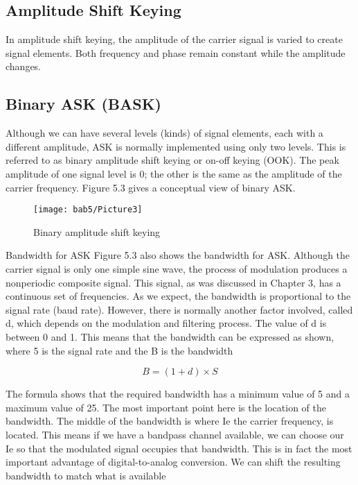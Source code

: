 \subsection{Amplitude Shift Keying}
In amplitude shift keying, the amplitude of the carrier signal is varied to create signal elements. Both frequency and phase remain constant while the amplitude changes.

\subsection*{Binary ASK (BASK)}
Although we can have several levels (kinds) of signal elements, each with a different amplitude, ASK is normally implemented using only two levels. This is referred to as binary amplitude shift keying or on-off keying (OOK). The peak amplitude of one signal level is 0; the other is the same as the amplitude of the carrier frequency. Figure 5.3 gives a conceptual view of binary ASK.

\begin{figure}[htbp]
  \centering
  \texttt{[image: bab5/Picture3]}
  \caption{Binary amplitude shift keying}
  \label{fig5:3}
\end{figure}

Bandwidth for ASK Figure 5.3 also shows the bandwidth for ASK. Although the carrier signal is only one simple sine wave, the process of modulation produces a nonperiodic composite signal. This signal, as was discussed in Chapter 3, has a continuous set of frequencies. As we expect, the bandwidth is proportional to the signal rate (baud rate). However, there is normally another factor involved, called d, which depends on the modulation and filtering process. The value of d is between 0 and 1. This means that the bandwidth can be expressed as shown, where 5 is the signal rate and the B is the bandwidth

\begin{equation}
  B = (1 + d) \times S
\end{equation}

The formula shows that the required bandwidth has a minimum value of 5 and a maximum value of 25. The most important point here is the location of the bandwidth. The middle of the bandwidth is where Ie the carrier frequency, is located. This means if we have a bandpass channel available, we can choose our Ie so that the modulated signal occupies that bandwidth. This is in fact the most important advantage of digital-to-analog conversion. We can shift the resulting bandwidth to match what is available

